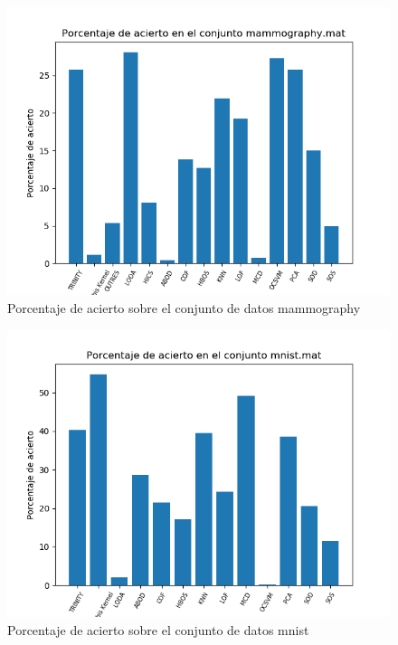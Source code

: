 \begin{figure}[H]
	\centering
	\includegraphics[scale=0.7]{imagenes/imgs-exp1/accuracy/mammography}
	\caption{Porcentaje de acierto sobre el conjunto de datos mammography}
	\label{mammography_accuracy}
\end{figure}

\begin{figure}[H]
	\centering
	\includegraphics[scale=0.7]{imagenes/imgs-exp1/accuracy/mnist}
	\caption{Porcentaje de acierto sobre el conjunto de datos mnist}
	\label{mnist_accuracy}
\end{figure}

